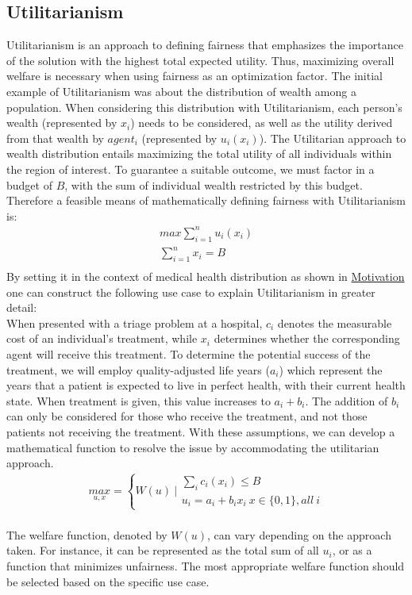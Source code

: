 \documentclass[german, a4paper, 11pt, oneside]{scrbook}
\begin{document}
\subsection{Utilitarianism}
Utilitarianism is an approach to defining fairness that emphasizes the importance of the solution with the highest total expected utility. \cite{Savulescu.2020} Thus, maximizing overall welfare is necessary when using fairness as an optimization factor. The initial example of Utilitarianism was about the distribution of wealth among a population. When considering this distribution with Utilitarianism, each person's wealth (represented by $x_i$) needs to be considered, as well as the utility derived from that wealth by $agent_i$ (represented by $u_i(x_i)$). The Utilitarian approach to wealth distribution entails maximizing the total utility of all individuals within the region of interest. To guarantee a suitable outcome, we must factor in a budget of $B$, with the sum of individual wealth restricted by this budget. \cite{Hooker,XinyingChen.2023} Therefore a feasible means of mathematically defining fairness with Utilitarianism is:\\
\begin{align}
   max\sum_{i=1}^{n} u_i(x_i) \\ \sum_{i=1}^{n} x_i = B  \\ 
\end{align}  \cite{XinyingChen.2023} 
By setting it in the context of medical health distribution as shown in \hyperref[sec:motivation]{Motivation} one can construct the following use case to explain Utilitarianism in greater detail:\\ When presented with a triage problem at a hospital, $c_i$ denotes the measurable cost of an individual's treatment, while $x_i$ determines whether the corresponding agent will receive this treatment. To determine the potential success of the treatment, we will employ quality-adjusted life years ($a_i$) which represent the years that a patient is expected to live in perfect health, with their current health state. When treatment is given, this value increases to $a_i + b_i$. The addition of $b_i$ can only be considered for those who receive the treatment, and not those patients not receiving the treatment. \cite{XinyingChen.2023} With these assumptions, we can develop a mathematical function to resolve the issue by accommodating the utilitarian approach. \\
\begin{align}
  \underset{u,x}{max}  = \left\{ W(u)\ | \begin{array}{l}
    \sum_{i} c_i(x_i) \le B\\
    u_i=a_i + b_i x_i \ x \in \{0,1\}, \mathit{all\ i }
  \end{array}\right. 
\end{align} \cite{XinyingChen.2023}
\\
The welfare function, denoted by $W(u)$, can vary depending on the approach taken. For instance, it can be represented as the total sum of all $u_i$, or as a function that minimizes unfairness. 
The most appropriate welfare function should be selected based on the specific use case. \cite{XinyingChen.2023}
\end{document}
